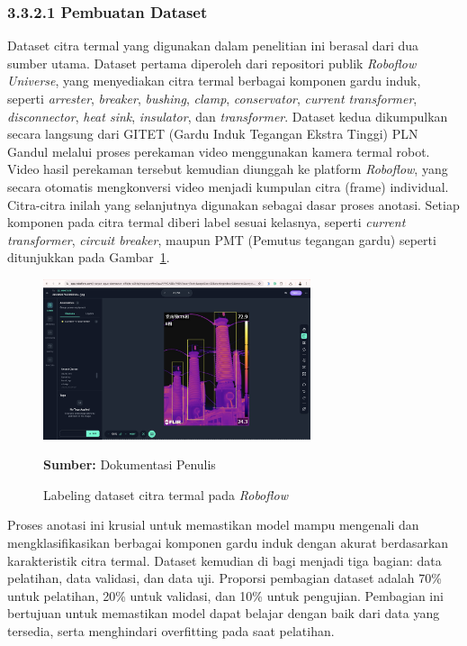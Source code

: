 \subsubsection{3.3.2.1 Pembuatan Dataset}
Dataset citra termal yang digunakan dalam penelitian ini berasal dari dua sumber utama. Dataset pertama diperoleh dari repositori publik \emph{Roboflow Universe}, yang menyediakan citra termal berbagai komponen gardu induk, seperti \emph{arrester}, \emph{breaker}, \emph{bushing}, \emph{clamp}, \emph{conservator}, \emph{current transformer}, \emph{disconnector}, \emph{heat sink}, \emph{insulator}, dan \emph{transformer}. Dataset kedua dikumpulkan secara langsung dari GITET (Gardu Induk Tegangan Ekstra Tinggi) PLN Gandul melalui proses perekaman video menggunakan kamera termal robot. Video hasil perekaman tersebut kemudian diunggah ke platform \emph{Roboflow}, yang secara otomatis mengkonversi video menjadi kumpulan citra (frame) individual. Citra-citra inilah yang selanjutnya digunakan sebagai dasar proses anotasi. Setiap komponen pada citra termal diberi label sesuai kelasnya, seperti \emph{current transformer}, \emph{circuit breaker}, maupun PMT (Pemutus tegangan gardu) seperti ditunjukkan pada Gambar~\ref{fig:dataset-annotated}. 
\begin{figure}[H]
  \centering
  \includegraphics[width=0.7\textwidth]{gambar/bab3/dataset-anotated.png}
  \caption{Labeling dataset citra termal pada \emph{Roboflow}}
  \label{fig:dataset-annotated}
  \footnotesize{\textbf{Sumber:} Dokumentasi Penulis}
  \end{figure}
  
Proses anotasi ini krusial untuk memastikan model mampu mengenali dan mengklasifikasikan berbagai komponen gardu induk dengan akurat berdasarkan karakteristik citra termal. Dataset kemudian di bagi menjadi tiga bagian: data pelatihan, data validasi, dan data uji. Proporsi pembagian dataset adalah 70\% untuk pelatihan, 20\% untuk validasi, dan 10\% untuk pengujian. Pembagian ini bertujuan untuk memastikan model dapat belajar dengan baik dari data yang tersedia, serta menghindari overfitting pada saat pelatihan.

